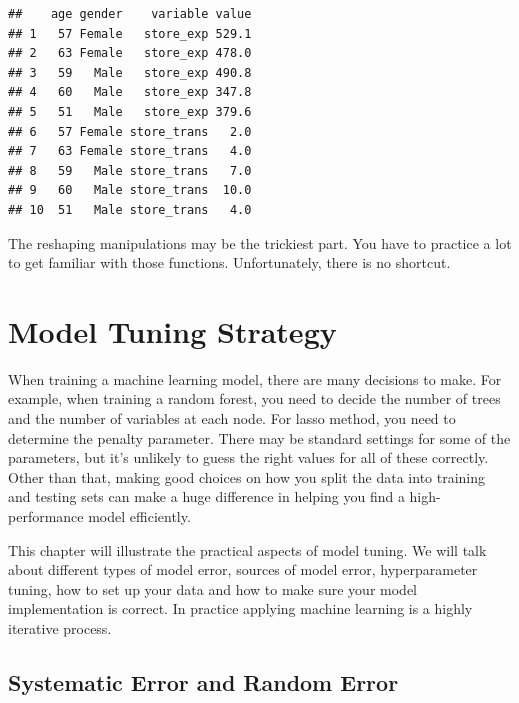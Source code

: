\documentclass[12pt,]{krantz}
\makeatletter
\newenvironment{Shaded}{\begin{snugshade}}{\end{snugshade}}
\newcommand{\DataTypeTok}[1]{\textcolor[rgb]{0.27,0.27,0.27}{#1}}
\newcommand{\KeywordTok}[1]{\textcolor[rgb]{0.27,0.27,0.27}{\textbf{#1}}}
\newcommand{\NormalTok}[1]{#1}
\newcommand{\OperatorTok}[1]{\textcolor[rgb]{0.43,0.43,0.43}{\textbf{#1}}}
\newcommand{\StringTok}[1]{\textcolor[rgb]{0.5,0.5,0.5}{#1}}
\newenvironment{kframe}{%
\medskip{}
\setlength{\fboxsep}{.8em}
 \def\at@end@of@kframe{}%
 \ifinner\ifhmode%
  \def\at@end@of@kframe{\end{minipage}}%
  \begin{minipage}{\columnwidth}%
 \fi\fi%
 \def\FrameCommand##1{\hskip\@totalleftmargin \hskip-\fboxsep
 \colorbox{shadecolor}{##1}\hskip-\fboxsep
     \hskip-\linewidth \hskip-\@totalleftmargin \hskip\columnwidth}%
 \MakeFramed {\advance\hsize-\width
   \@totalleftmargin\z@ \linewidth\hsize
   \@setminipage}}%
 {\par\unskip\endMakeFramed%
 \at@end@of@kframe}
\renewenvironment{Shaded}{\begin{kframe}}{\end{kframe}}
\makeatother
\begin{document}
\begin{Shaded}
\end{Shaded}

\begin{verbatim}
##    age gender    variable value
## 1   57 Female   store_exp 529.1
## 2   63 Female   store_exp 478.0
## 3   59   Male   store_exp 490.8
## 4   60   Male   store_exp 347.8
## 5   51   Male   store_exp 379.6
## 6   57 Female store_trans   2.0
## 7   63 Female store_trans   4.0
## 8   59   Male store_trans   7.0
## 9   60   Male store_trans  10.0
## 10  51   Male store_trans   4.0
\end{verbatim}

The reshaping manipulations may be the trickiest part. You have to practice a lot to get familiar with those functions. Unfortunately, there is no shortcut.

\hypertarget{model-tuning-strategy}{%
\chapter{Model Tuning Strategy}\label{model-tuning-strategy}}

When training a machine learning model, there are many decisions to make. For example, when training a random forest, you need to decide the number of trees and the number of variables at each node. For lasso method, you need to determine the penalty parameter. There may be standard settings for some of the parameters, but it's unlikely to guess the right values for all of these correctly. Other than that, making good choices on how you split the data into training and testing sets can make a huge difference in helping you find a high-performance model efficiently.

This chapter will illustrate the practical aspects of model tuning. We will talk about different types of model error, sources of model error, hyperparameter tuning, how to set up your data and how to make sure your model implementation is correct. In practice applying machine learning is a highly iterative process.

\hypertarget{systematic-error-and-random-error}{%
\section{Systematic Error and Random Error}\label{systematic-error-and-random-error}}
\end{document}
